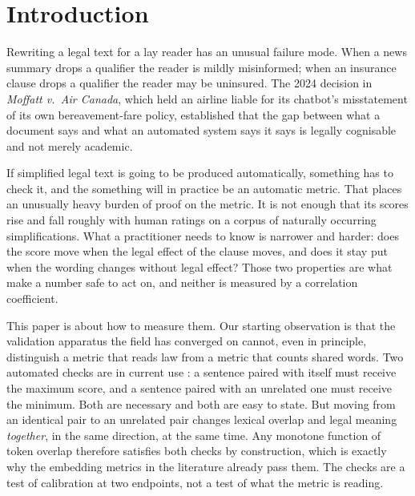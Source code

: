 \documentclass[11pt]{article}
\begin{document}
\begin{abstract}
\emph{l'assur\'e} for \emph{l'assureur}, while bidirectional NLI entailment
spends $\maxMargin$ and ranks $93\%$ of items correctly. Crucially the two
orderings come apart: the best-correlating signal on the corpus is the worst on
the diagnostic, so a metric chosen by correlation alone is chosen wrongly.
Retraining under an evaluation that never scores a model on its own
augmentation reverses a further result: the augmentation reported to raise $r$
from $0.74$ to $0.97$ instead costs more than half of it, on every seed.
Distributional and quantile objectives, by contrast, buy stability and risk
asymmetry rather than accuracy. Code, corrected splits, and the diagnostic are released.
\end{abstract}

\section{Introduction}
\label{sec:intro}

Rewriting a legal text for a lay reader has an unusual failure mode. When a news
summary drops a qualifier the reader is mildly misinformed; when an insurance
clause drops a qualifier the reader may be uninsured. The 2024 decision in
\emph{Moffatt v.\ Air Canada}, which held an airline liable for its chatbot's
misstatement of its own bereavement-fare policy, established that the gap
between what a document says and what an automated system says it says is
legally cognisable and not merely academic.

If simplified legal text is going to be produced automatically, something has to
check it, and the something will in practice be an automatic metric. That places
an unusually heavy burden of proof on the metric. It is not enough that its
scores rise and fall roughly with human ratings on a corpus of naturally
occurring simplifications. What a practitioner needs to know is narrower and
harder: does the score move when the legal effect of the clause moves, and does
it stay put when the wording changes without legal effect? Those two properties
are what make a number safe to act on, and neither is measured by a correlation
coefficient.

This paper is about how to measure them. Our starting observation is that the
validation apparatus the field has converged on cannot, even in principle,
distinguish a metric that reads law from a metric that counts shared words. Two
automated checks are in current use \citep{beauchemin2023meaningbert,
beauchemin2025judgebert}: a sentence paired with itself must receive the maximum
score, and a sentence paired with an unrelated one must receive the minimum.
Both are necessary and both are easy to state. But moving from an identical pair
to an unrelated pair changes lexical overlap and legal meaning \emph{together},
in the same direction, at the same time. Any monotone function of token overlap
therefore satisfies both checks by construction, which is exactly why the
embedding metrics in the literature already pass them. The checks are a test of
calibration at two endpoints, not a test of what the metric is reading.
\end{document}
